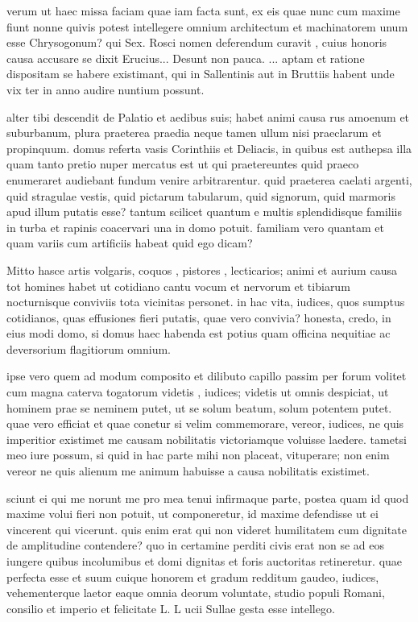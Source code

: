  verum ut haec missa faciam quae iam facta sunt, ex eis quae nunc cum maxime fiunt nonne quivis potest intellegere omnium architectum et machinatorem unum esse Chrysogonum? qui Sex. Rosci nomen deferendum curavit , cuius honoris causa accusare se dixit Erucius... Desunt non pauca. ... aptam et ratione dispositam se habere existimant, qui in Sallentinis aut in Bruttiis habent unde vix ter in anno audire nuntium possunt.

 alter tibi descendit de Palatio et aedibus suis; habet animi causa rus amoenum et suburbanum, plura praeterea praedia neque tamen ullum nisi praeclarum et propinquum. domus referta vasis Corinthiis et Deliacis, in quibus est authepsa illa quam tanto pretio nuper mercatus est ut qui praetereuntes quid praeco enumeraret audiebant fundum venire arbitrarentur. quid praeterea caelati argenti, quid stragulae vestis, quid pictarum tabularum, quid signorum, quid marmoris apud illum putatis esse? tantum scilicet quantum e multis splendidisque familiis in turba et rapinis coacervari una in domo potuit. familiam vero quantam et quam variis cum artificiis habeat quid ego dicam?

 Mitto hasce artis volgaris, coquos , pistores , lecticarios; animi et aurium causa tot homines habet ut cotidiano cantu vocum et nervorum et tibiarum nocturnisque conviviis tota vicinitas personet. in hac vita, iudices, quos sumptus cotidianos, quas effusiones fieri putatis, quae vero convivia? honesta, credo, in eius modi domo, si domus haec habenda est potius quam officina nequitiae ac deversorium flagitiorum omnium.

 ipse vero quem ad modum composito et dilibuto capillo passim per forum volitet cum magna caterva togatorum videtis , iudices; videtis ut omnis despiciat, ut hominem prae se neminem putet, ut se solum beatum, solum potentem putet. quae vero efficiat et quae conetur si velim commemorare, vereor, iudices, ne quis imperitior existimet me causam nobilitatis victoriamque voluisse laedere. tametsi meo iure possum, si quid in hac parte mihi non placeat, vituperare; non enim vereor ne quis alienum me animum habuisse a causa nobilitatis existimet.

 sciunt ei qui me norunt me pro mea tenui infirmaque parte, postea quam id quod maxime volui fieri non potuit, ut componeretur, id maxime defendisse ut ei vincerent qui vicerunt. quis enim erat qui non videret humilitatem cum dignitate de amplitudine contendere? quo in certamine perditi civis erat non se ad eos iungere quibus incolumibus et domi dignitas et foris auctoritas retineretur. quae perfecta esse et suum cuique honorem et gradum redditum gaudeo, iudices, vehementerque laetor eaque omnia deorum voluntate, studio populi Romani, consilio et imperio et felicitate L. L ucii Sullae gesta esse intellego.

